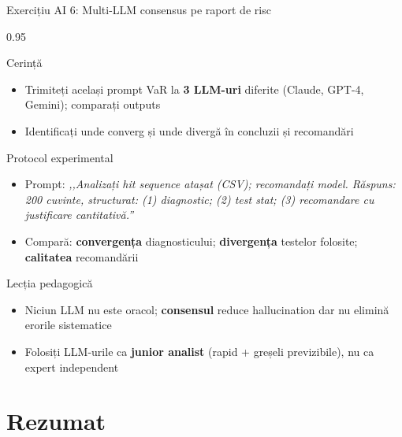 \documentclass[9pt, aspectratio=169, t]{beamer}
\begin{document}
\begin{frame}[shrink=10]{Exercițiu AI 6: Multi-LLM consensus pe raport de risc}
    \begin{cminipage}{0.95\textwidth}
    \begin{block}{Cerință}
    \begin{itemize}\setlength{\itemsep}{0pt}
        \item Trimiteți același prompt VaR la \textbf{3 LLM-uri} diferite (Claude, GPT-4, Gemini); comparați outputs
        \item Identificați unde converg și unde divergă în concluzii și recomandări
    \end{itemize}
    \end{block}
    \begin{exampleblock}{Protocol experimental}
    \begin{itemize}\setlength{\itemsep}{0pt}
        \item Prompt: \textit{,,Analizați hit sequence atașat (CSV); recomandați model. Răspuns: 200 cuvinte, structurat: (1) diagnostic; (2) test stat; (3) recomandare cu justificare cantitativă.''}
        \item Compară: \textbf{convergența} diagnosticului; \textbf{divergența} testelor folosite; \textbf{calitatea} recomandării
    \end{itemize}
    \end{exampleblock}
    \begin{alertblock}{Lecția pedagogică}
    \begin{itemize}\setlength{\itemsep}{0pt}
        \item Niciun LLM nu este oracol; \textbf{consensul} reduce hallucination dar nu elimină erorile sistematice
        \item Folosiți LLM-urile ca \textbf{junior analist} (rapid + greșeli previzibile), nu ca expert independent
    \end{itemize}
    \end{alertblock}
    \end{cminipage}
\end{frame}

\section{Rezumat}
\end{document}
